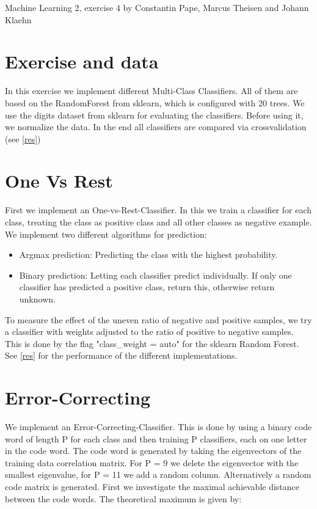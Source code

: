 \documentclass{article}
\begin{document}
Machine Learning 2, exercise 4 by Constantin Pape, Marcus Theisen and Johann Klaehn
 
\section{Exercise and data}

In this exercise we implement different Multi-Class Classifiers.
All of them are based on the RandomForest from sklearn, which is configured with 20 trees.
We use the digits dataset from sklearn for evaluating the classifiers.
Before using it, we normalize the data.
In the end all classifiers are compared via crossvalidation (see \autoref{res})

\section{One Vs Rest}

First we implement an One-vs-Rest-Classifier. In this we train a classifier for each class, treating the class as positive class and all other classes as negative example.
\newline
We implement two different algorithms for prediction:
\begin{itemize}
    \item Argmax prediction: Predicting the class with the highest probability.
    \item Binary prediction: Letting each classifier predict individually. If only one classifier has predicted a positive class, return this, otherwise return unknown.
\end{itemize}
To measure the effect of the uneven ratio of negative and positive samples, we try a classifier with weights adjusted to the ratio of positive to negative samples. 
This is done by the flag "class\_weight = auto" for the sklearn Random Forest.
See \autoref{res} for the performance of the different implementations.

\section{Error-Correcting}

We implement an Error-Correcting-Classifier. This is done by using a binary code word of length P for each class and then training P classifiers, each on one letter in the code word.
The code word is generated by taking the eigenvectors of the training data correlation matrix.
For P = 9 we delete the eigenvector with the smallest eigenvalue, for P = 11 we add a random column.
Alternatively a random code matrix is generated.
First we investigate the maximal achievable distance between the code words.
The theoretical maximum is given by:
\end{document}
